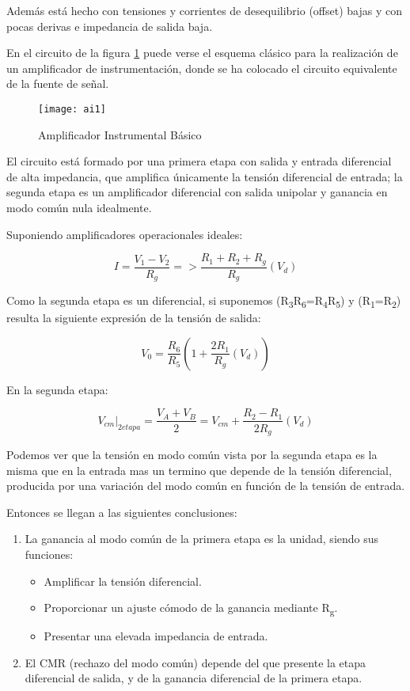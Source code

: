 Además está hecho con tensiones y corrientes de desequilibrio (offset) bajas y con pocas derivas e impedancia de salida baja.

En el circuito de la figura \ref{fig:aibasico} puede verse el esquema clásico para la realización de un amplificador de instrumentación, donde se ha colocado el circuito equivalente de la fuente de señal.

\begin{figure}[h]
  \centering
  \texttt{[image: ai1]}
  \caption{Amplificador Instrumental Básico}\label{fig:aibasico}
\end{figure}

El circuito está formado por una primera etapa con salida y entrada diferencial de alta impedancia, que amplifica únicamente la tensión diferencial de entrada; la segunda etapa es un amplificador diferencial con salida unipolar y ganancia en modo común nula idealmente.

Suponiendo amplificadores operacionales ideales: 

\begin{equation}\label{eq1}
I = \frac{V_1 - V_2}{R_g}  => \frac{R_1+R_2+R_g}{R_g} (V_d)
\end{equation}

Como la segunda etapa es un diferencial, si suponemos (R\textsubscript{3}R\textsubscript{6}=R\textsubscript{4}R\textsubscript{5}) y  (R\textsubscript{1}=R\textsubscript{2}) resulta la siguiente expresión de la tensión de salida:

\begin{equation}\label{eq2}
V_0 = \frac{R_6}{R_5}(1 +\frac{2R_1}{R_g} (V_d))
\end{equation}

En la segunda etapa:

\begin{equation}\label{eq3}
V_{cm}|_{2etapa} = \frac{V_A + V_B}{2}=V_{cm} +\frac{R_2 - R_1}{2R_g}(V_d)
\end{equation}

Podemos ver que la tensión en modo común vista por la segunda etapa es la misma que en la entrada mas un termino que depende de la tensión diferencial, producida por una variación del modo común en función de la tensión de entrada.

Entonces se llegan a las siguientes conclusiones:
\begin{enumerate}
\item La ganancia al modo común de la primera etapa es la unidad, siendo sus funciones:
\begin{itemize}
\item Amplificar la tensión diferencial.
\item Proporcionar un ajuste cómodo de la ganancia mediante R\textsubscript{g}.
\item Presentar una elevada impedancia de entrada.
\end{itemize}
\item El CMR (rechazo del modo común) depende del que presente la etapa diferencial de salida, y de la ganancia diferencial de la primera etapa.
\end{enumerate}

